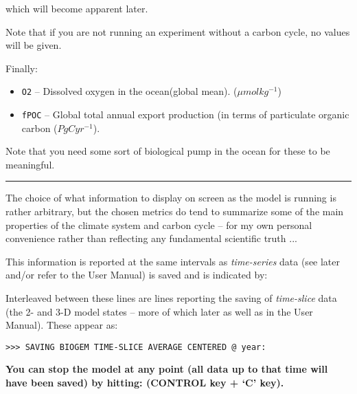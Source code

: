 \noindent which will become apparent later.

Note that if you are not running an experiment without a carbon cycle, no values will be given.

\newpage

\noindent Finally:

\vspace{1mm}\begin{itemize}
\item[] \texttt{O2} -- Dissolved oxygen in the ocean(global mean). ($\mu mol kg^{-1}$)
\item[] \texttt{fPOC} -- Global total annual export production (in terms of particulate organic carbon ($PgC yr^{-1}$).
\end{itemize}\vspace{1mm}

Note that you need some sort of biological pump in the ocean for these to be meaningful.

\vspace{1mm}\noindent\rule{4cm}{0.5pt}\vspace{2mm}

\noindent The choice of what information to display on screen as the model is running is rather arbitrary, but the chosen metrics do tend to summarize some of the main properties of the climate system and carbon cycle – for my own personal convenience rather than reflecting any fundamental scientific truth ... 

This information is reported at the same intervals as \textit{time-series} data (see later and/or refer to the User Manual) is saved and is indicated by:

Interleaved between these lines are lines reporting the saving of \textit{time-slice} data (the 2- and 3-D model states – more of which later as well as in the User Manual). These appear as:

\vspace{-2mm}\small\begin{verbatim}
>>> SAVING BIOGEM TIME-SLICE AVERAGE CENTERED @ year:
\end{verbatim}\normalsize\vspace{-2mm}

\noindent \textbf{You can stop the model at any point (all data up to that time will have been saved) by hitting: \textsf{} (\textsf{\footnotesize CONTROL} key + ‘\textsf{\footnotesize C}’ key).}

